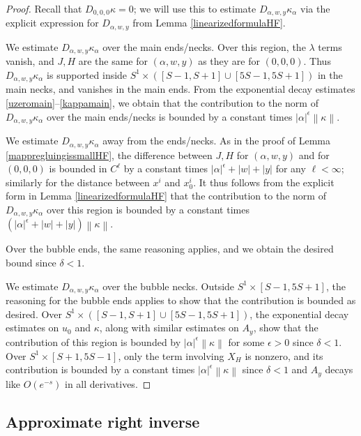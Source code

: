 \documentclass[12pt]{article}
\theoremstyle{definition}
\theoremstyle{remark}
\numberwithin{equation}{subsection}
\begin{document}
\begin{proof}
Recall that $D_{0,0,0}\kappa=0$; we will use this to estimate $D_{\alpha,w,y}\kappa_\alpha$ via the explicit expression for $D_{\alpha,w,y}$ from Lemma \ref{linearizedformulaHF}.

We estimate $D_{\alpha,w,y}\kappa_\alpha$ over the main ends/necks.  Over this region, the $\lambda$ terms vanish, and $J,H$ are the same for $(\alpha,w,y)$ as they are for $(0,0,0)$.  Thus $D_{\alpha,w,y}\kappa_\alpha$ is supported inside $S^1\times([S-1,S+1]\cup[5S-1,5S+1])$ in the main necks, and vanishes in the main ends.  From the exponential decay estimates \eqref{uzeromain}--\eqref{kappamain}, we obtain that the contribution to the norm of $D_{\alpha,w,y}\kappa_\alpha$ over the main ends/necks is bounded by a constant times $\left|\alpha\right|^\epsilon\left\|\kappa\right\|$.

We estimate $D_{\alpha,w,y}\kappa_\alpha$ away from the ends/necks.  As in the proof of Lemma \ref{mappregluingissmallHF}, the difference between $J,H$ for $(\alpha,w,y)$ and for $(0,0,0)$ is bounded in $C^\ell$ by a constant times $\left|\alpha\right|^\epsilon+\left|w\right|+\left|y\right|$ for any $\ell<\infty$; similarly for the distance between $x^i$ and $x^i_0$.  It thus follows from the explicit form in Lemma \ref{linearizedformulaHF} that the contribution to the norm of $D_{\alpha,w,y}\kappa_\alpha$ over this region is bounded by a constant times $(\left|\alpha\right|^\epsilon+\left|w\right|+\left|y\right|)\left\|\kappa\right\|$.

Over the bubble ends, the same reasoning applies, and we obtain the desired bound since $\delta<1$.

We estimate $D_{\alpha,w,y}\kappa_\alpha$ over the bubble necks.  Outside $S^1\times[S-1,5S+1]$, the reasoning for the bubble ends applies to show that the contribution is bounded as desired.  Over $S^1\times([S-1,S+1]\cup[5S-1,5S+1])$, the exponential decay estimates on $u_0$ and $\kappa$, along with similar estimates on $A_y$, show that the contribution of this region is bounded by $\left|\alpha\right|^\epsilon\left\|\kappa\right\|$ for some $\epsilon>0$ since $\delta<1$.  Over $S^1\times[S+1,5S-1]$, only the term involving $X_H$ is nonzero, and its contribution is bounded by a constant times $\left|\alpha\right|^\epsilon\left\|\kappa\right\|$ since $\delta<1$ and $A_y$ decays like $O(e^{-s})$ in all derivatives.
\end{proof}

\subsection{Approximate right inverse}
\end{document}
